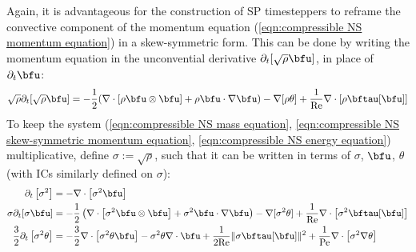     Again, it is advantageous for the construction of SP timesteppers to reframe the convective component of the momentum equation (\ref{eqn:compressible NS momentum equation}) in a skew-symmetric form. This can be done by writing the momentum equation in the unconvential derivative $\partial_{t}[\sqrt{\rho}\bfu]$, in place of $\partial_{t}\bfu$:
    \begin{equation}
        \sqrt{\rho}\partial_{t}[\sqrt{\rho}\bfu]  =  - \frac{1}{2}(\nabla\cdot\left[\rho\bfu\otimes\bfu\right] + \rho\bfu\cdot\nabla\bfu) - \nabla[\rho\theta] + \frac{1}{\rmRe}\nabla\cdot[\rho\bftau[\bfu]]  \label{eqn:compressible NS skew-symmetric momentum equation}
    \end{equation}
    To keep the system (\ref{eqn:compressible NS mass equation}, \ref{eqn:compressible NS skew-symmetric momentum equation}, \ref{eqn:compressible NS energy equation}) multiplicative, define $\sigma := \sqrt{\rho}$, such that it can be written in terms of $\sigma$, $\bfu$, $\theta$ (with ICs similarly defined on $\sigma$):
    \begin{align}
                         \partial_{t}\left[\sigma^{2}\right]  &=  - \nabla\cdot\left[\sigma^{2}\bfu\right]  \label{eqn:compressible NS sqrt mass equation}  \\
                              \sigma\partial_{t}[\sigma\bfu]  &=  - \frac{1}{2}\left(\nabla\cdot\left[\sigma^{2}\bfu\otimes\bfu\right] + \sigma^{2}\bfu\cdot\nabla\bfu\right) - \nabla[\sigma^{2}\theta] + \frac{1}{\rmRe}\nabla\cdot\left[\sigma^{2}\bftau[\bfu]\right]  \\
        \frac{3}{2}\partial_{t}\left[\sigma^{2}\theta\right]  &=  - \frac{3}{2}\nabla\cdot\left[\sigma^{2}\theta\bfu\right] - \sigma^{2}\theta\nabla\cdot\bfu + \frac{1}{2\rmRe}\|\sigma\bftau[\bfu]\|^{2} + \frac{1}{\rmPe}\nabla\cdot\left[\sigma^{2}\nabla\theta\right]  \label{eqn:compressible NS sqrt energy equation}
    \end{align}

    \begin{remark}
    \end{remark}

